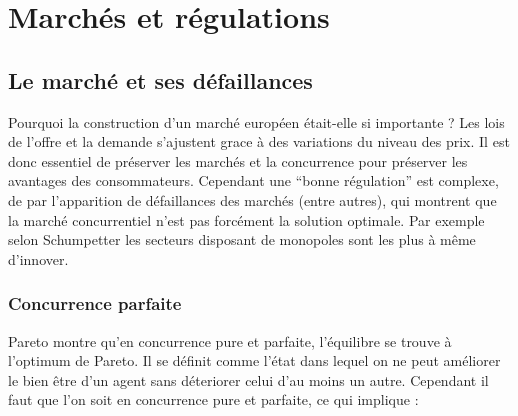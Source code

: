 \section{Marchés et régulations} %
\label{prt:marches_et_regulations}

\subsection{Le marché et ses défaillances} %
\label{sec:le_marche_et_ses_defaillances}

Pourquoi la construction d'un marché européen était-elle si importante ? Les lois de l'offre et la demande s'ajustent grace à des variations du niveau des prix. Il est donc essentiel de préserver les marchés et la concurrence pour préserver les avantages des consommateurs. Cependant une ``bonne régulation'' est complexe, de par l'apparition de défaillances des marchés (entre autres), qui montrent que la marché concurrentiel n'est pas forcément la solution optimale. Par exemple selon Schumpetter les secteurs disposant de monopoles sont les plus à même d'innover.

\subsubsection{Concurrence parfaite} %
\label{sub:concurrence_parfaite}

Pareto montre qu'en concurrence pure et parfaite, l'équilibre se trouve à l'optimum de Pareto. Il se définit comme l'état dans lequel on ne peut améliorer le bien être d'un agent sans déteriorer celui d'au moins un autre. Cependant il faut que l'on soit en concurrence pure et parfaite, ce qui implique : 

